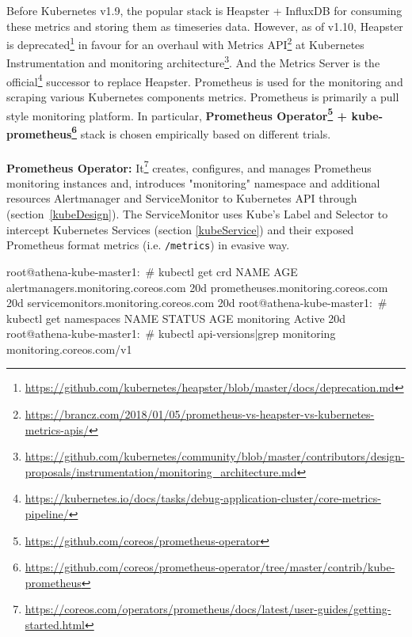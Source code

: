 Before Kubernetes v1.9, the popular stack is Heapster + InfluxDB for consuming these metrics and storing them as timeseries data. However, as of v1.10, Heapster is deprecated\footnote{\url{https://github.com/kubernetes/heapster/blob/master/docs/deprecation.md}} in favour for an overhaul with Metrics API\footnote{\url{https://brancz.com/2018/01/05/prometheus-vs-heapster-vs-kubernetes-metrics-apis/}} at Kubernetes Instrumentation and monitoring architecture\footnote{\url{https://github.com/kubernetes/community/blob/master/contributors/design-proposals/instrumentation/monitoring_architecture.md}}. And the Metrics Server is the official\footnote{\url{https://kubernetes.io/docs/tasks/debug-application-cluster/core-metrics-pipeline/}} successor to replace Heapster. Prometheus is used for the monitoring and scraping various Kubernetes components metrics. Prometheus is primarily a pull style monitoring platform. In particular, \textbf{Prometheus Operator\footnote{\url{https://github.com/coreos/prometheus-operator}} + kube-prometheus\footnote{\url{https://github.com/coreos/prometheus-operator/tree/master/contrib/kube-prometheus}}} stack  is chosen empirically based on different trials.
\\
\\
\noindent \textbf{Prometheus Operator:} \quad It\footnote{\url{https://coreos.com/operators/prometheus/docs/latest/user-guides/getting-started.html}} creates, configures, and manages Prometheus monitoring instances and, introduces "monitoring" namespace and additional resources Alertmanager and ServiceMonitor to Kubernetes API through  (section~\ref{kubeDesign}). The ServiceMonitor uses Kube's Label and Selector to intercept Kubernetes Services (section \ref{kubeService}) and their exposed Prometheus format metrics (i.e. \verb|/metrics|) in evasive way.

\begin{small}
\begin{lcverbatim}
root@athena-kube-master1:~# kubectl get crd
NAME                                    AGE
alertmanagers.monitoring.coreos.com     20d
prometheuses.monitoring.coreos.com      20d
servicemonitors.monitoring.coreos.com   20d
root@athena-kube-master1:~# kubectl get namespaces
NAME          STATUS    AGE
monitoring    Active    20d
root@athena-kube-master1:~# kubectl api-versions|grep monitoring
monitoring.coreos.com/v1
\end{lcverbatim}
\end{small}

